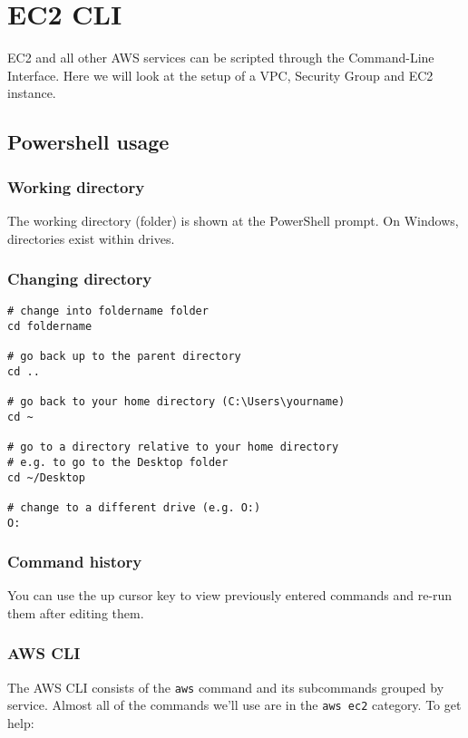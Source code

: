 \chapter{EC2 CLI}


EC2 and all other AWS services can be scripted through the Command-Line Interface.
Here we will look at the setup of a VPC, Security Group and EC2 instance.

\section{Powershell usage}

\subsection{Working directory}

The working directory (folder) is shown at the PowerShell prompt.
On Windows, directories exist within drives. 

\subsection{Changing directory}

\begin{verbatim}
# change into foldername folder
cd foldername

# go back up to the parent directory
cd ..

# go back to your home directory (C:\Users\yourname)
cd ~

# go to a directory relative to your home directory
# e.g. to go to the Desktop folder
cd ~/Desktop

# change to a different drive (e.g. O:)
O: 
\end{verbatim}

\subsection{Command history}

You can use the up cursor key to view previously entered commands and re-run them after editing them.

\subsection{AWS CLI}

The AWS CLI consists of the \texttt{aws} command and its subcommands grouped by service. 
Almost all of the commands we'll use are in the \texttt{aws ec2} category.
To get help:


